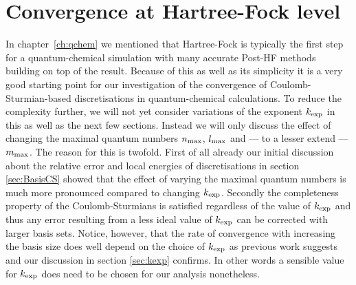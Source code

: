 \section{Convergence at Hartree-Fock level}
\label{sec:CSconvergenceHF}
In chapter~\vref{ch:qchem} we mentioned that Hartree-Fock
is typically the first step for a quantum-chemical simulation
with many accurate Post-HF methods building on top of the \HF result.
Because of this as well as its simplicity it is a very good
starting point for our investigation of the convergence
of Coulomb-Sturmian-based discretisations in quantum-chemical calculations.
To reduce the complexity further,
we will not yet consider variations of the \CS exponent $k_\text{exp}$ in this as well as
the next few sections.
Instead we will only discuss the effect of changing the maximal quantum numbers
$n_\text{max}$, $l_\text{max}$ and --- to a lesser extend --- $m_\text{max}$.
The reason for this is twofold.
First of all already our initial discussion
about the relative error and local energies of \CS discretisations
in section \vref{sec:BasisCS}
showed that the effect of varying the maximal quantum numbers
is much more pronounced compared to changing $k_\text{exp}$.
Secondly the completeness property of the Coulomb-Sturmians
is satisfied regardless of the value of $k_\text{exp}$
and thus any error resulting from a less ideal
value of $k_\text{exp}$ can be corrected with larger basis sets.
Notice, however,
that the rate of convergence with increasing the basis size
does well depend on the choice of $k_\text{exp}$
as previous work suggests~\cite{Avery2017}
and our discussion in section \ref{sec:kexp} confirms.
In other words a sensible value for $k_\text{exp}$ does need to be chosen
for our analysis nonetheless.

